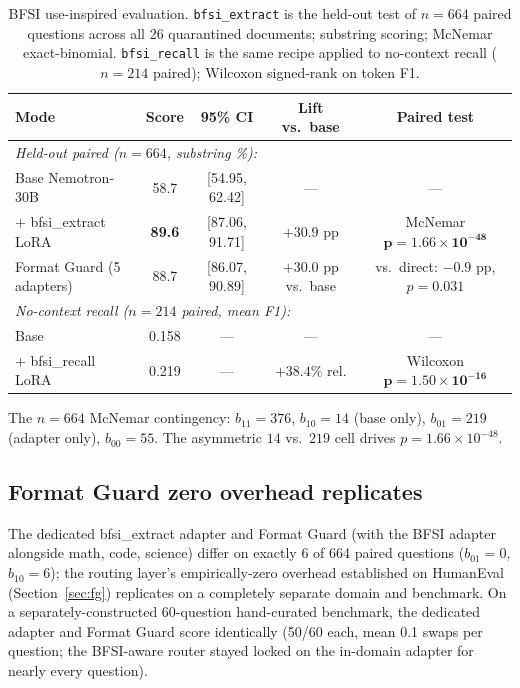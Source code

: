 \documentclass{article}
\begin{document}
\begin{table}[h]
  \caption{BFSI use-inspired evaluation. \texttt{bfsi\_extract} is the held-out test of $n=664$ paired questions across all 26 quarantined documents; substring scoring; McNemar exact-binomial. \texttt{bfsi\_recall} is the same recipe applied to no-context recall ($n=214$ paired); Wilcoxon signed-rank on token F1.}
  \label{tab:bfsi}
  \centering
  \begin{tabular}{lcccc}
    \toprule
    Mode & Score & 95\% CI & Lift vs.\ base & Paired test \\
    \midrule
    \multicolumn{5}{l}{\textit{Held-out paired ($n=664$, substring \%):}} \\
    Base Nemotron-30B & 58.7 & [54.95, 62.42] & --- & --- \\
    + bfsi\_extract LoRA & \textbf{89.6} & [87.06, 91.71] & $+30.9$ pp & McNemar $\mathbf{p = 1.66 \times 10^{-48}}$ \\
    Format Guard (5 adapters) & 88.7 & [86.07, 90.89] & $+30.0$ pp vs.\ base & vs.\ direct: $-0.9$ pp, $p=0.031$ \\
    \midrule
    \multicolumn{5}{l}{\textit{No-context recall ($n=214$ paired, mean F1):}} \\
    Base & 0.158 & --- & --- & --- \\
    + bfsi\_recall LoRA & 0.219 & --- & $+38.4\%$ rel. & Wilcoxon $\mathbf{p = 1.50 \times 10^{-16}}$ \\
    \bottomrule
  \end{tabular}
\end{table}

The $n=664$ McNemar contingency: $b_{11} = 376$, $b_{10} = 14$ (base only), $b_{01} = 219$ (adapter only), $b_{00} = 55$. The asymmetric $14$ vs.\ $219$ cell drives $p = 1.66 \times 10^{-48}$.

\subsection{Format Guard zero overhead replicates}

The dedicated bfsi\_extract adapter and Format Guard (with the BFSI adapter alongside math, code, science) differ on exactly 6 of 664 paired questions ($b_{01} = 0$, $b_{10} = 6$); the routing layer's empirically-zero overhead established on HumanEval (Section~\ref{sec:fg}) replicates on a completely separate domain and benchmark. On a separately-constructed 60-question hand-curated benchmark, the dedicated adapter and Format Guard score identically (50/60 each, mean 0.1 swaps per question; the BFSI-aware router stayed locked on the in-domain adapter for nearly every question).
\end{document}
